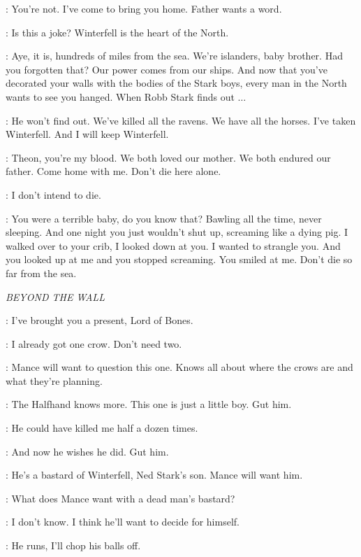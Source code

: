\YARA: You're not. I've come to bring you home. Father wants a word. 

\THEON: Is this a joke? Winterfell is the heart of the North. 

\YARA: Aye, it is, hundreds of miles from the sea. We're islanders, baby brother. Had you forgotten that? Our power comes from our ships. And now that you've decorated your walls with the bodies of the Stark boys, every man in the North wants to see you hanged. When Robb Stark finds out $\ldots$  

\THEON: He won't find out. We've killed all the ravens. We have all the horses. I've taken Winterfell. And I will keep Winterfell. 

\YARA: Theon, you're my blood. We both loved our mother. We both endured our father. Come home with me. Don't die here alone. 

\THEON: I don't intend to die. 

\YARA: You were a terrible baby, do you know that? Bawling all the time, never sleeping. And one night you just wouldn't shut up, screaming like a dying pig. I walked over to your crib, I looked down at you. I wanted to strangle you. And you looked up at me and you stopped screaming. You smiled at me. Don't die so far from the sea. 


\scene

\textit{BEYOND THE WALL} 


\YGRITTE: I've brought you a present, Lord of Bones. 

\LORDOFBONES: I already got one crow. Don't need two. 

\YGRITTE: Mance will want to question this one. Knows all about where the crows are and what they're planning. 

\LORDOFBONES: The Halfhand knows more. This one is just a little boy. Gut him. 

\YGRITTE: He could have killed me half a dozen times. 

\LORDOFBONES: And now he wishes he did. Gut him. 

\YGRITTE: He's a bastard of Winterfell, Ned Stark's son. Mance will want him. 

\LORDOFBONES: What does Mance want with a dead man's bastard? 

\YGRITTE: I don't know. I think he'll want to decide for himself. 

\LORDOFBONES: He runs, I'll chop his balls off. 

